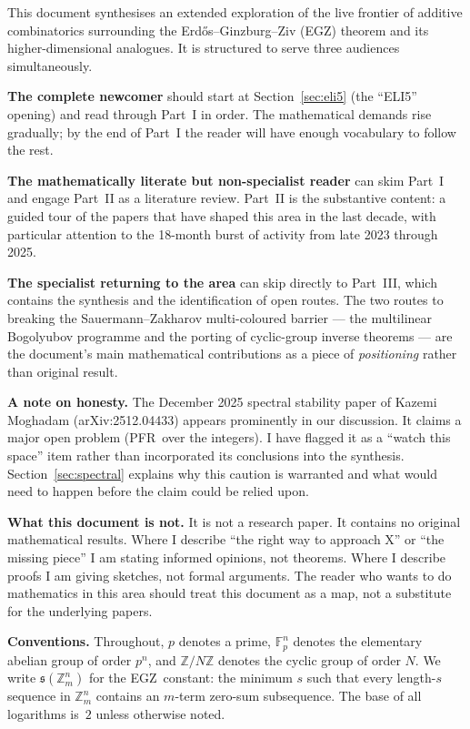 \documentclass[11pt,a4paper]{article}
\theoremstyle{plain}
\theoremstyle{definition}
\theoremstyle{remark}
\newcommand{\F}{\mathbb{F}}
\newcommand{\Z}{\mathbb{Z}}
\newcommand{\sUFp}{\mathfrak{s}}
\newcommand{\PFR}{\textsf{PFR}}
\newcommand{\EGZ}{\textsf{EGZ}}
\begin{document}
This document synthesises an extended exploration of the live frontier of additive combinatorics surrounding the Erd\H{o}s--Ginzburg--Ziv (\EGZ) theorem and its higher-dimensional analogues. It is structured to serve three audiences simultaneously.

\textbf{The complete newcomer} should start at Section~\ref{sec:eli5} (the ``ELI5'' opening) and read through Part~I in order. The mathematical demands rise gradually; by the end of Part~I the reader will have enough vocabulary to follow the rest.

\textbf{The mathematically literate but non-specialist reader} can skim Part~I and engage Part~II as a literature review. Part~II is the substantive content: a guided tour of the papers that have shaped this area in the last decade, with particular attention to the 18-month burst of activity from late 2023 through 2025.

\textbf{The specialist returning to the area} can skip directly to Part~III, which contains the synthesis and the identification of open routes. The two routes to breaking the Sauermann--Zakharov multi-coloured barrier --- the multilinear Bogolyubov programme and the porting of cyclic-group inverse theorems --- are the document's main mathematical contributions as a piece of \emph{positioning} rather than original result.

\textbf{A note on honesty.} The December 2025 spectral stability paper of Kazemi Moghadam (arXiv:2512.04433) appears prominently in our discussion. It claims a major open problem (\PFR\ over the integers). I have flagged it as a ``watch this space'' item rather than incorporated its conclusions into the synthesis. Section~\ref{sec:spectral} explains why this caution is warranted and what would need to happen before the claim could be relied upon.

\textbf{What this document is not.} It is not a research paper. It contains no original mathematical results. Where I describe ``the right way to approach X'' or ``the missing piece'' I am stating informed opinions, not theorems. Where I describe proofs I am giving sketches, not formal arguments. The reader who wants to do mathematics in this area should treat this document as a map, not a substitute for the underlying papers.

\textbf{Conventions.} Throughout, $p$ denotes a prime, $\F_p^n$ denotes the elementary abelian group of order $p^n$, and $\Z/N\Z$ denotes the cyclic group of order $N$. We write $\sUFp(\Z_m^n)$ for the \EGZ\ constant: the minimum $s$ such that every length-$s$ sequence in $\Z_m^n$ contains an $m$-term zero-sum subsequence. The base of all logarithms is~$2$ unless otherwise noted.
\end{document}
